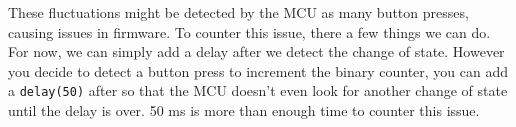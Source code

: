 \documentclass{article}
\begin{document}
These fluctuations might be detected by the MCU as many button presses, causing issues in firmware.
To counter this issue, there a few things we can do. For now, we can simply add a delay after we detect the change of state. However you decide to detect a button press to increment the binary counter, you can add a \verb|delay(50)| after so that the MCU doesn’t even look for another change of state until the delay is over. 50 ms is more than enough time to counter this issue.
\end{document}
